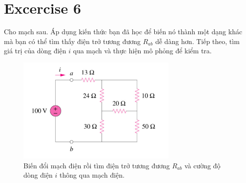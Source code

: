 \section{Excercise 6}
Cho mạch sau. Áp dụng kiến thức bạn đã học để biến nó thành một dạng khác mà bạn có thể tìm thấy điện trở tương đương \(R_{ab}\) dễ dàng hơn. Tiếp theo, tìm
giá trị của dòng điện \(i\) qua mạch và thực hiện mô phỏng để kiểm tra.
\begin{figure}[!htbp]
    \centering
    \includegraphics[width=0.7\textwidth]{graphics/ex6/f1.png}
    \caption{Biến đổi mạch điện rồi tìm điện trở tương đương \(R_{ab}\) và cường độ dòng điện
    \(i\) thông qua mạch điện.}
    \end{figure}
